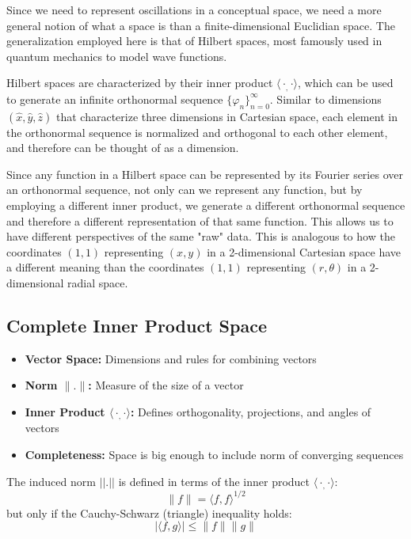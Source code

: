 \documentclass{article}
\def\innerproduct{\langle\cdot _, \cdot\rangle}
\def\orthseq{\{ \varphi_n \}_{n=0}^\infty}
\begin{document}
Since we need to represent oscillations in a conceptual space, we need a more general notion of what a space is than a finite-dimensional Euclidian space.  The generalization employed here is that of Hilbert spaces, most famously used in quantum mechanics to model wave functions.

Hilbert spaces are characterized by their inner product $\innerproduct$, which can be used to generate an infinite orthonormal sequence $\orthseq$.  Similar to dimensions $(\hat{x}, \hat{y}, \hat{z})$ that characterize three dimensions in Cartesian space, each element in the orthonormal sequence is normalized and orthogonal to each other element, and therefore can be thought of as a dimension. 

Since any function in a Hilbert space can be represented by its Fourier series over an orthonormal sequence, not only can we represent any function, but by employing a different inner product, we generate a different orthonormal sequence and therefore a different representation of that same function. This allows us to have different perspectives of the same "raw" data.  This is analogous to how the coordinates $(1,1)$ representing $(x,y)$ in a 2-dimensional Cartesian space have a different meaning than the coordinates $(1,1)$ representing $(r, \theta)$ in a 2-dimensional radial space.

\subsection{Complete Inner Product Space}
\begin{itemize}
  \item \textbf{Vector Space:} Dimensions and rules for combining vectors
  \item \textbf{Norm $\|.\|$:} Measure of the size of a vector
  \item \textbf{Inner Product $\innerproduct$:} Defines orthogonality, projections, and angles of vectors
  \item \textbf{Completeness:} Space is big enough to include norm of converging sequences
\end{itemize}

The induced norm $||.||$ is defined in terms of the inner product $\innerproduct$:
\begin{equation}
  \|f\| = \langle f, f \rangle^{1/2} 
\end{equation}
but only if the Cauchy-Schwarz (triangle) inequality holds:
\begin{equation}
|\langle f, g \rangle| \leq \|f\|\|g\| 
\end{equation}
\end{document}

